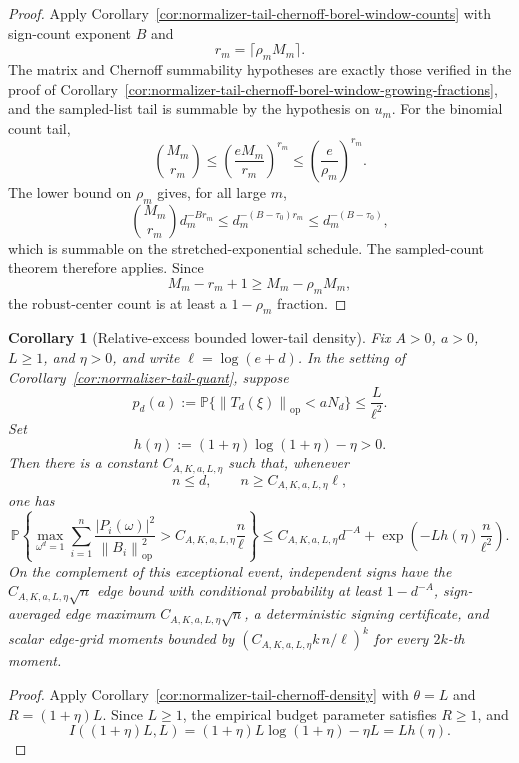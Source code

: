 \documentclass[11pt]{amsart}
\numberwithin{equation}{section}
\newtheorem{corollary}[theorem]{Corollary}
\theoremstyle{definition}
\theoremstyle{remark}
\newcommand{\op}{\mathrm{op}}
\newcommand{\Prob}{\mathbb P}
\newcommand{\norm}[1]{\left\lVert #1\right\rVert}
\newcommand{\abs}[1]{\left\lvert #1\right\rvert}
\begin{document}
\begin{proof}
Apply Corollary~\ref{cor:normalizer-tail-chernoff-borel-window-counts} with
sign-count exponent \(B\) and
\[
  r_m=\lceil\rho_mM_m\rceil .
\]
The matrix and Chernoff summability hypotheses are exactly those verified in the
proof of Corollary~\ref{cor:normalizer-tail-chernoff-borel-window-growing-fractions},
and the sampled-list tail is summable by the hypothesis on \(u_m\).  For the
binomial count tail,
\[
  \binom{M_m}{r_m}
  \le \left(\frac{eM_m}{r_m}\right)^{r_m}
  \le \left(\frac e{\rho_m}\right)^{r_m}.
\]
The lower bound on \(\rho_m\) gives, for all large \(m\),
\[
  \binom{M_m}{r_m}d_m^{-B r_m}
  \le d_m^{-(B-\tau_0)r_m}\le d_m^{-(B-\tau_0)},
\]
which is summable on the stretched-exponential schedule.  The sampled-count
theorem therefore applies.  Since
\[
  M_m-r_m+1\ge M_m-\rho_mM_m,
\]
the robust-center count is at least a \(1-\rho_m\) fraction.
\end{proof}

\begin{corollary}[Relative-excess bounded lower-tail density]
\label{cor:normalizer-tail-relative-density}
Fix \(A>0\), \(a>0\), \(L\ge1\), and \(\eta>0\), and write
\(\ell=\log(e+d)\).  In the setting of
Corollary~\ref{cor:normalizer-tail-quant}, suppose
\[
  p_d(a):=\Prob\{\norm{T_d(\xi)}_{\op}<aN_d\}\le \frac{L}{\ell^2}.
\]
Set
\[
  h(\eta):=(1+\eta)\log(1+\eta)-\eta>0 .
\]
Then there is a constant \(C_{A,K,a,L,\eta}\) such that, whenever
\[
  n\le d,\qquad n\ge C_{A,K,a,L,\eta}\ell ,
\]
one has
\[
  \Prob\left\{
  \max_{\omega^d=1}
  \sum_{i=1}^n
  \frac{\abs{P_i(\omega)}^2}{\norm{B_i}_{\op}^2}
  > C_{A,K,a,L,\eta}\frac n\ell
  \right\}
  \le C_{A,K,a,L,\eta}d^{-A}
     +\exp\left(-Lh(\eta)\frac n{\ell^2}\right).
\]
On the complement of this exceptional event, independent signs have the
\(C_{A,K,a,L,\eta}\sqrt n\) edge bound with conditional probability at least
\(1-d^{-A}\), sign-averaged edge maximum \(C_{A,K,a,L,\eta}\sqrt n\), a
deterministic signing certificate, and scalar edge-grid moments bounded by
\((C_{A,K,a,L,\eta}k\,n/\ell)^k\) for every \(2k\)-th moment.
\end{corollary}

\begin{proof}
Apply Corollary~\ref{cor:normalizer-tail-chernoff-density} with
\(\theta=L\) and \(R=(1+\eta)L\).  Since \(L\ge1\), the empirical budget
parameter satisfies \(R\ge1\), and
\[
  I((1+\eta)L,L)
  =(1+\eta)L\log(1+\eta)-\eta L
  =Lh(\eta).
\]
\end{proof}
\end{document}
